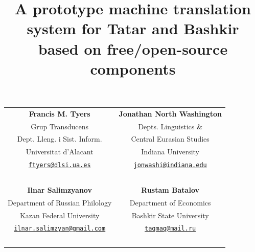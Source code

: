 \documentclass[10pt,xetex]{beamer} %
\date{}
\title{A prototype machine translation system for Tatar and Bashkir \\
              based on free/open-source components}
\begin{document}
\begin{frame}
        \titlepage
\centering
\vspace{-4em}
\begin{tabular}{cc}
 {\bf Francis M. Tyers} & {\bf Jonathan North Washington} \\
 Grup Transducens & Depts. Linguistics \&\\
 Dept. Lleng. i Sist. Inform. & Central Eurasian Studies \\
 Universitat d'Alacant & Indiana University \\
 {\tt \href{mailto:ftyers@dlsi.ua.es}{ftyers@dlsi.ua.es}} & {\tt \href{mailto:jonwashi@indiana.edu}{jonwashi@indiana.edu}} \\ 
 ~ & ~ \\
 {\bf Ilnar Salimzyanov} & {\bf Rustam Batalov} \\
 Department of Russian Philology & Department of Economics \\ 
 Kazan Federal University & Bashkir State University \\
 {\tt \href{mailto:ilnar.salimzyan@gmail.com}{ilnar.salimzyan@gmail.com}} & {\tt \href{mailto:taqmaq@mail.ru}{taqmaq@mail.ru}} \\
 ~ & ~ \\
\end{tabular}

\end{frame}
\end{document}
